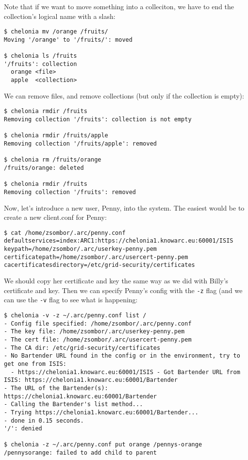\documentclass{article}
\begin{document}
Note that if we want to move something into a colleciton, we have to end the collection's logical name with a slash:

\begin{verbatim}
$ chelonia mv /orange /fruits/
Moving '/orange' to '/fruits/': moved

$ chelonia ls /fruits
'/fruits': collection
  orange <file>
  apple  <collection>
\end{verbatim}

We can remove files, and remove collections (but only if the collection is empty):

\begin{verbatim}
$ chelonia rmdir /fruits
Removing collection '/fruits': collection is not empty

$ chelonia rmdir /fruits/apple
Removing collection '/fruits/apple': removed

$ chelonia rm /fruits/orange
/fruits/orange: deleted

$ chelonia rmdir /fruits
Removing collection '/fruits': removed
\end{verbatim}

Now, let's introduce a new user, Penny, into the system. The easiest would be to create a new client.conf for Penny:

\begin{verbatim}
$ cat /home/zsombor/.arc/penny.conf 
defaultservices=index:ARC1:https://chelonia1.knowarc.eu:60001/ISIS
keypath=/home/zsombor/.arc/userkey-penny.pem
certificatepath=/home/zsombor/.arc/usercert-penny.pem
cacertificatesdirectory=/etc/grid-security/certificates    
\end{verbatim}

We should copy her certificate and key the same way as we did with Billy's certificate and key. Then we can specify Penny's config with the \verb!-z! flag (and we can use the \verb!-v! flag to see what is happening:

\begin{verbatim}
$ chelonia -v -z ~/.arc/penny.conf list /
- Config file specified: /home/zsombor/.arc/penny.conf
- The key file: /home/zsombor/.arc/userkey-penny.pem
- The cert file: /home/zsombor/.arc/usercert-penny.pem
- The CA dir: /etc/grid-security/certificates
- No Bartender URL found in the config or in the environment, try to get one from ISIS:
  - https://chelonia1.knowarc.eu:60001/ISIS - Got Bartender URL from ISIS: https://chelonia1.knowarc.eu:60001/Bartender
- The URL of the Bartender(s): https://chelonia1.knowarc.eu:60001/Bartender
- Calling the Bartender's list method...
- Trying https://chelonia1.knowarc.eu:60001/Bartender...
- done in 0.15 seconds.
'/': denied

$ chelonia -z ~/.arc/penny.conf put orange /pennys-orange
/pennysorange: failed to add child to parent
\end{verbatim}
\end{document}
